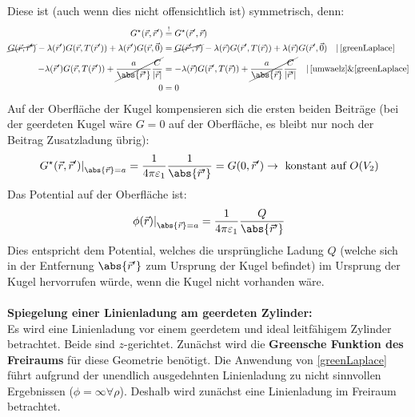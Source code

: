 	  	Diese ist (auch wenn dies nicht offensichtlich ist) symmetrisch, denn:
	  	\begin{equation*}\begin{split}
	  			G^\star(\vec{r} , \vec{r}' ) & \stackrel{!}{=} G^\star(\vec{r}' , \vec{r} )\\
	  			\cancel{G(\vec{r} , \vec{r}' )} - \lambda(\vec{r}' ) G(\vec{r} , T(\vec{r}' )) + \lambda(\vec{r}' ) G(\vec{r} , \vec{0}) &=\cancel{G(\vec{r}' , \vec{r} )} - \lambda(\vec{r} ) G(\vec{r}' , T(\vec{r} )) + \lambda(\vec{r} ) G(\vec{r}' , \vec{0}) \quad |\, \text{\ref{greenLaplace}} \\
	  			- \lambda(\vec{r}' ) G(\vec{r} , T(\vec{r}' )) + \cancel{\frac{a}{\abs{\vec{r}' }} \frac{C}{|\vec{r}|}} &=  - \lambda(\vec{r} ) G(\vec{r}' , T(\vec{r} )) + \cancel{ \frac{a}{\abs{\vec{r} }} \frac{C}{|\vec{r}'|}} \quad |\,  \text{\ref{umwaelz}\&\ref{greenLaplace}}\\
	  			0&=0
	  	\end{split}\end{equation*}
		  	 Auf der Oberfläche der Kugel kompensieren sich die ersten beiden Beiträge (bei der geerdeten Kugel wäre $G=0$ auf der Oberfläche, es bleibt nur noch der Beitrag Zusatzladung übrig):
		  	\begin{equation}
		  		\left. G^\star(\vec{r} , \vec{r}' )\right|_{\abs{\vec{r} }=a} = \frac{1}{4\pi\varepsilon_1} \frac{1}{\abs{\vec{r}' }} = G(0,\vec{r}' ) \to  \text{ konstant auf } O(V_2)
		  	\end{equation}
		  	Das Potential auf der Oberfläche ist:
		  	\begin{equation}
		  		\left. \phi(\vec{r} )\right|_{\abs{\vec{r} }=a} = \frac{1}{4\pi\varepsilon_1} \frac{Q}{\abs{\vec{r}' }}
		  	\end{equation}
		  	Dies entspricht dem Potential, welches die ursprüngliche Ladung $Q$ (welche sich in der Entfernung $\abs{\vec{r}' }$ zum Ursprung der Kugel befindet) im Ursprung der Kugel hervorrufen würde, wenn die Kugel nicht vorhanden wäre.\\\\
		  \textbf{Spiegelung einer Linienladung am geerdeten Zylinder:}\\
		  	  	 Es wird eine Linienladung vor einem geerdetem und ideal leitfähigem Zylinder betrachtet. Beide sind $z$-gerichtet.
		  	 Zunächst wird die \textbf{Greensche Funktion des Freiraums} für diese Geometrie benötigt. Die Anwendung von \ref{greenLaplace} führt aufgrund der unendlich ausgedehnten Linienladung zu nicht sinnvollen Ergebnissen ($\phi=\infty\forall\rho$). Deshalb wird zunächst eine Linienladung im Freiraum betrachtet.
